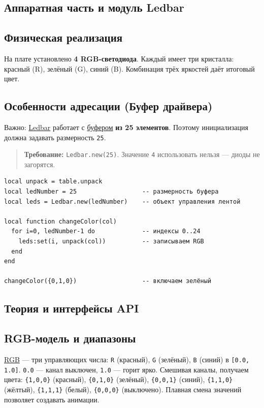 \subsection{Аппаратная часть и модуль Ledbar}
\subsection{Физическая реализация}
На плате установлено \textbf{4 RGB-светодиода}. Каждый имеет три кристалла: красный (R), зелёный (G), синий (B). Комбинация трёх яркостей даёт итоговый цвет.

\subsection{Особенности адресации (Буфер драйвера)}
Важно: \hyperlink{term:ledbar}{Ledbar} работает с \hyperlink{term:buffer}{буфером} \textbf{из 25 элементов}. Поэтому инициализация должна задавать размерность \verb|25|.
\begin{quote}
\textbf{Требование:} \verb|Ledbar.new(25)|. Значение \verb|4| использовать нельзя — диоды не загорятся.
\end{quote}
\begin{verbatim}
local unpack = table.unpack
local ledNumber = 25                  -- размерность буфера
local leds = Ledbar.new(ledNumber)    -- объект управления лентой

local function changeColor(col)
  for i=0, ledNumber-1 do             -- индексы 0..24
    leds:set(i, unpack(col))          -- записываем RGB
  end
end

changeColor({0,1,0})                  -- включаем зелёный
\end{verbatim}

\subsection{Теория и интерфейсы API}
\subsection{RGB-модель и диапазоны}
\hyperlink{term:rgb}{RGB} — три управляющих числа: \verb|R| (красный), \verb|G| (зелёный), \verb|B| (синий) в \verb|[0.0, 1.0]|. \verb|0.0| — канал выключен, \verb|1.0| — горит ярко. Смешивая каналы, получаем цвета: \verb|{1,0,0}| (красный), \verb|{0,1,0}| (зелёный), \verb|{0,0,1}| (синий), \verb|{1,1,0}| (жёлтый), \verb|{1,1,1}| (белый), \verb|{0,0,0}| (выключено). Плавная смена значений позволяет создавать анимации.

